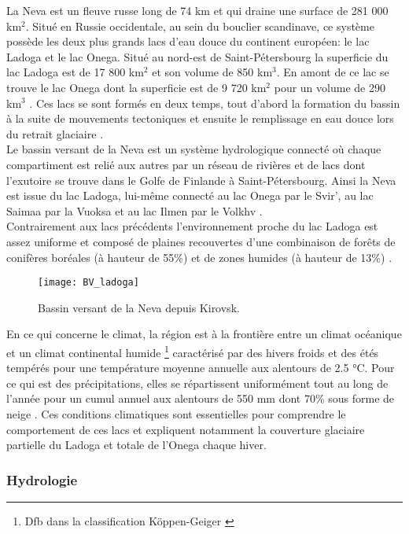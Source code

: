 La Neva est un fleuve russe long de 74 km et qui draine une surface de 281 000 km$^{2}$. Situé en Russie occidentale, au sein du bouclier scandinave, ce système possède les deux plus grands lacs d'eau douce du continent européen: le lac Ladoga et le lac Onega. Situé au nord-est de Saint-Pétersbourg la superficie du lac Ladoga est de 17 800 km$^{2}$ et son volume de 850 km$^{3}$. En amont de ce lac se trouve le lac Onega dont la superficie est de 9 720 km$^{2}$ pour un volume de 290 km$^{3}$ \citep{filatov2019}. Ces lacs se sont formés en deux temps, tout d'abord la formation du bassin à la suite de mouvements tectoniques et ensuite le remplissage en eau douce lors du retrait glaciaire \citep{malmqvist2009}.\\
Le bassin versant de la Neva est un système hydrologique connecté où chaque compartiment est relié aux autres par un réseau de rivières et de lacs dont l'exutoire se trouve dans le Golfe de Finlande à Saint-Pétersbourg. Ainsi la Neva est issue du lac Ladoga, lui-même connecté au lac Onega par le Svir', au lac Saimaa par la Vuoksa et au lac Ilmen par le Volkhv \citep{rukhovets2010}.\\
Contrairement aux lacs précédents l'environnement proche du lac Ladoga est assez uniforme et composé de plaines recouvertes d'une combinaison de forêts de conifères boréales (à hauteur de 55\%) et de zones humides (à hauteur de 13\%) \citep{malmqvist2009}.\\

\begin{figure}[h!]
\centering
\texttt{[image: BV\_ladoga]}
\caption{Bassin versant de la Neva depuis Kirovsk.}
\label{bv_ladoga}
\end{figure}

En ce qui concerne le climat, la région est à la frontière entre un climat océanique et un climat continental humide \footnote{Dfb dans la classification Köppen-Geiger \citep{beck2018}} caractérisé par des hivers froids et des étés tempérés pour une température moyenne annuelle aux alentours de 2.5 °C. Pour ce qui est des précipitations, elles se répartissent uniformément tout au long de l'année pour un cumul annuel aux alentours de 550 mm dont 70\% sous forme de neige \citep{malmqvist2009}. Ces conditions climatiques sont essentielles pour comprendre le comportement de ces lacs et expliquent notamment la couverture glaciaire partielle du Ladoga et totale de l'Onega chaque hiver.

\subsubsection*{{\selectfont Hydrologie}}
\label{sec:hydrologie_ladoga}

